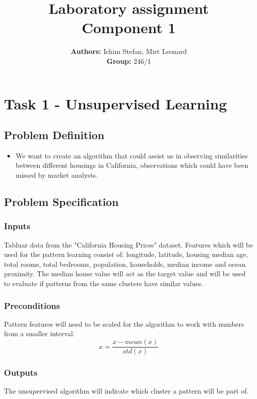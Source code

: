 \documentclass[a4paper, 11pt]{article}
\title{\textbf{Laboratory assignment} \\[1ex] \large \textbf{Component} {1}}
\author{\textbf{Authors:} {Ichim Stefan, Mirt Leonard}\\ \textbf{Group:} {246/1}}
\begin{document}
\maketitle

\section{Task 1 - Unsupervised Learning}

\subsection{Problem Definition}

\begin{itemize}
  \item{
    We want to create an algorithm that could assist us in 
    observing similarities between different housings in California,
    observations which could have been missed by market analysts.
  }
\end{itemize}

\subsection{Problem Specification}

\subsubsection*{Inputs} 
  Tabluar data from the "California Housing Prices" dataset.
  Features which will be used for the pattern learning
  consist of: longitude, latitude, housing median age, total rooms,
  total bedrooms, population, households, median income and ocean 
  proximity. The median house value will act as the target value 
  and will be used to evaluate if patterns from the same clusters
  have similar values.

\subsubsection*{Preconditions} 
  Pattern features will need to be scaled for the algorithm
  to work with numbers from a smaller interval.
  $$
  x = \frac{x - mean(x)}{std(x)}
  $$

\subsubsection*{Outputs} 
  The unsupervised algorithm will indicate which cluster a pattern
  will be part of.
  
\end{document}
